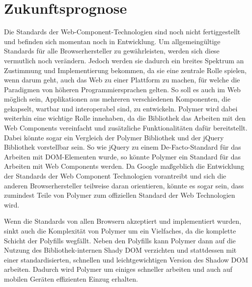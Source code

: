 \chapter{Zukunftsprognose}\label{zukunftsprognose}

Die Standards der Web-Component-Technologien sind noch nicht fertiggestellt und befinden sich momentan noch in Entwicklung. Um allgemeingültige Standards für alle Browserhersteller zu gewährleisten, werden sich diese vermutlich noch verändern. Jedoch werden sie dadurch ein breites Spektrum an Zustimmung und Implementierung bekommen, da sie eine zentrale Rolle spielen, wenn darum geht, auch das Web zu einer Plattform zu machen, für welche die Paradigmen von höheren Programmiersprachen gelten. So soll es auch im Web möglich sein, Applikationen aus mehreren verschiedenen Komponenten, die gekapselt, wartbar und interoperabel sind, zu entwickeln. Polymer wird dabei weiterhin eine wichtige Rolle innehaben, da die Bibliothek das Arbeiten mit den Web Components vereinfacht und zusätzliche Funktionalitäten dafür bereitstellt. Dabei könnte sogar ein Vergleich der Polymer Bibliothek und der jQuery Bibliothek vorstellbar sein. So wie jQuery zu einem De-Facto-Standard für das Arbeiten mit \ac{DOM}-Elementen wurde, so könnte Polymer ein Standard für das Arbeiten mit Web Components werden. Da Google maßgeblich die Entwicklung der Standards der Web Component Technologien vorantreibt und sich die anderen Browserhersteller teilweise daran orientieren, könnte es sogar sein, dass zumindest Teile von Polymer zum offiziellen Standard der Web Technologien wird.

Wenn die Standards von allen Browsern akzeptiert und implementiert wurden, sinkt auch die Komplexität von Polymer um ein Vielfaches, da die komplette Schicht der Polyfills wegfällt. Neben den Polyfills kann Polymer dann auf die Nutzung des Bibliothek-internen Shady \ac{DOM} verzichten und stattdessen mit einer standardisierten, schnellen und leichtgewichtigen Version des Shadow \ac{DOM} arbeiten. Dadurch wird Polymer um einiges schneller arbeiten und auch auf mobilen Geräten effizienten Einzug erhalten.

